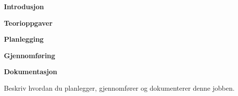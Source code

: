 \vskip 10pt 
\textbf{Introdusjon}

\vskip 5pt 

\vskip 5pt 


\vskip 10pt 
\textbf{Teorioppgaver}

\vskip 5pt 

\vskip 10pt 
\textbf{Planlegging}


\vskip 10pt 
\textbf{Gjennomføring}

\vskip 10pt 
\textbf{Dokumentasjon}

Beskriv hvordan du planlegger, gjennomfører og dokumenterer denne jobben. 



















\vfil \eject

















